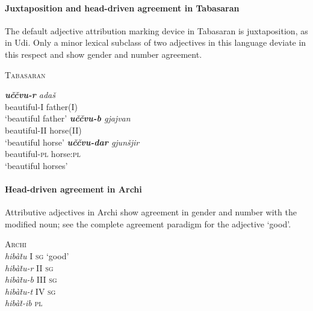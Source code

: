 \paragraph{Juxtaposition and head-driven agreement in Tabasaran}
The default adjective attribution marking device in Tabasaran is juxtaposition, as in Udi. Only a minor lexical subclass of two adjectives in this language deviate in this respect and show gender and number agreement.
\begin{exe}
\ex \textsc{Tabasaran} \citep[50–51]{kurbanov1986}
\begin{xlist}
\ex 
\gll \textit{\textbf{uččvu-r} adaš}\\
	beautiful-\textsc{I} father\textsc{(I)}\\
\glt	‘beautiful father’
\ex 
\gll \textit{\textbf{uččvu-b} gjajvan}\\
	beautiful-\textsc{II} horse\textsc{(II)}\\
\glt	‘beautiful horse’
\ex
\gll \textit{\textbf{uččvu-dar} gjunšjir}\\
	beautiful-\textsc{pl} horse:\textsc{pl}\\
\glt	‘beautiful horses’
\end{xlist}
\end{exe}

\paragraph{Head-driven agreement in Archi}
Attributive adjectives in Archi show agreement in gender and number with the modified noun; see the complete agreement paradigm for the adjective ‘good’.
\begin{exe}
\ex \textsc{Archi} \citep{kibrik1994a}\\
\textit{hibàt̄u} \textsc{I sg} ‘good’\\
\textit{hibàt̄u-r} \textsc{II sg}\\
\textit{hibàt̄u-b} \textsc{III sg}\\
\textit{hibàt̄u-t} \textsc{IV sg}\\
\textit{hibàt̄-ib} \textsc{pl}
\end{exe}

